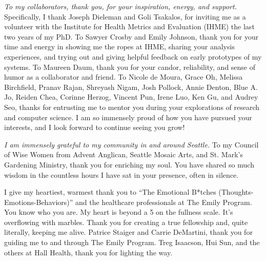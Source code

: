 \textit{To my collaborators, thank you, for your inspiration, energy, and support.}
Specifically, I thank Joseph Dieleman and Goli Tsakalos, for inviting me as
a volunteer with the Institute for Health Metrics and Evaluation (IHME) the
last two years of my PhD. To Sawyer Crosby and Emily Johnson, thank you for
your time and energy in showing me the ropes at IHME, sharing your analysis
experiences, and trying out and giving helpful feedback on early prototypes
of my systems. To Maureen Daum, thank you for your candor, reliability, and
sense of humor as a collaborator and friend. To Nicole de Moura, Grace Oh,
Melissa Birchfield, Pranav Rajan, Shreyash Nigam, Josh Pollock, Annie
Denton, Blue A. Jo, Reiden Chea, Corinne Herzog, Vincent Pun, Irene Luo, Ken
Gu, and Audrey Seo, thanks for entrusting me to mentor you during your
explorations of research and computer science. I am so immensely proud of
how you have pursued your interests, and I look forward to continue seeing
you grow!

\textit{I am immensely grateful to my community in and around Seattle.} To my
Council of Wise Women from Advent Anglican, Seattle Mosaic Arts, and St. Mark's
Gardening Ministry, thank you for enriching my soul. You have shared so much
wisdom in the countless hours I have sat in your presence, often in silence.

I give my heartiest, warmest thank you to ``The Emotional B*tches
(Thoughts-Emotions-Behaviors)'' and the healthcare professionals at The Emily Program. You know who you are. 
My heart is beyond a 5 on the fullness scale. It's overflowing with marbles.
Thank you for creating a true fellowship and, quite literally, keeping me
alive. Patrice Staiger and Carrie DeMartini, thank you for guiding me to and
through The Emily Program. Treg Isaacson, Hui Sun, and the others 
at Hall Health, thank you for lighting the way.

